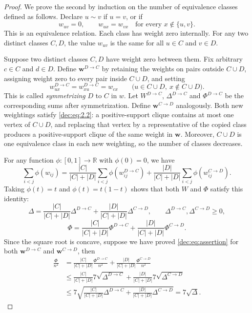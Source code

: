 \documentclass[11pt]{article}
\numberwithin{equation}{section}
\theoremstyle{remark}
\begin{document}
\begin{proof}
We prove the second by induction on the number of equivalence classes defined as follows.
Declare \(u\sim v\) if
\(u=v\), or if
\begin{equation*}
 w_{uv}=0,\qquad w_{ux}=w_{vx}\quad
 \text{for every }x\notin\{u,v\}.
\end{equation*}
This is an equivalence relation. Each class has weight zero internally.
For any two distinct classes \(C,D\), the value \(w_{uv}\) is the same for all \(u\in C\) and \(v\in D\).

Suppose two distinct classes \(C,D\) have weight zero between them. Fix arbitrary \(c\in C\) and \(d\in D\).
Define \(\mathbf{w}^{D\to C}\) by retaining the weights on pairs outside \(C\cup D\),
assigning weight zero to every pair inside \(C\cup D\), and setting
\begin{equation*}
 w^{D\to C}_{ux}=w^{D\to C}_{xu}=w_{cx}
 \qquad
 \bigl(u\in C\cup D,\ x\notin C\cup D\bigr).
\end{equation*}
This is called \emph{symmetrizing} \(D\) to \(C\) in \(w\).
Let \(W^{D\to C}\), \(\Delta^{D\to C}\) and \(\Phi^{D\to C}\) be the corresponding sums after symmetrization.
Define \(\mathbf{w}^{C\to D}\) analogously. Both new weightings satisfy \eqref{dec:eq:2.2}: a positive-support
clique contains at most one vertex of \(C\cup D\), and replacing that vertex by a representative of the copied
class produces a positive-support clique of the same weight in \(\mathbf{w}\).
Moreover, \(C\cup D\) is one equivalence class in each new weighting, so the number of classes decreases.

For any function \(\phi:[0,1]\to\mathbb R\) with \(\phi(0)=0\), we have
\begin{equation*}
  \sum_{i<j}\phi(w_{ij}) = \frac{|C|}{|C|+|D|}\sum_{i<j}\phi(w^{D\to C}_{ij}) + \frac{|D|}{|C|+|D|}\sum_{i<j}\phi(w^{C\to D}_{ij}).
\end{equation*}
Taking \(\phi(t)=t\) and \(\phi(t)=t(1-t)\) shows that both \(W\) and \(\Phi\) satisfy this identity:
\begin{equation*}
 \Delta=\frac{|C|}{|C|+|D|}\Delta^{D\to C}+\frac{|D|}{|C|+|D|}\Delta^{C\to D},
 \qquad \Delta^{D\to C},\Delta^{C\to D}\ge0,
\end{equation*}
\begin{equation*}
 \Phi=\frac{|C|}{|C|+|D|}\Phi^{D\to C}+\frac{|D|}{|C|+|D|}\Phi^{C\to D}.
\end{equation*}
Since the square root is concave, suppose we have proved \eqref{dec:eq:assertion} for both \(\mathbf{w}^{D\to C}\) and \(\mathbf{w}^{C\to D}\), then
\begin{equation*}
\begin{aligned}
  \frac{\Phi}{n^2} &= \frac{|C|}{|C|+|D|}\frac{\Phi^{D\to C}}{n^2}+\frac{|D|}{|C|+|D|}\frac{\Phi^{C\to D}}{n^2}\\
 &\le \frac{|C|}{|C|+|D|}7\sqrt{\Delta^{D\to C}}+\frac{|D|}{|C|+|D|}7\sqrt{\Delta^{C\to D}}\\
 &\le 7\sqrt{\frac{|C|}{|C|+|D|}\Delta^{D\to C}+\frac{|D|}{|C|+|D|}\Delta^{C\to D}} = 7\sqrt{\Delta}.
\end{aligned}
\end{equation*}


\end{proof}
\end{document}

